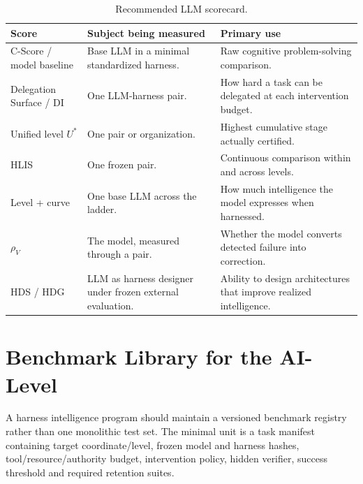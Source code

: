\documentclass[11pt]{article}
\theoremstyle{definition}
\newcommand{\rhov}{\ensuremath{\rho_V}}
\begin{document}
\begin{table}[!htbp]
\centering\small
\begin{tabularx}{\textwidth}{@{}lYY@{}}
\toprule
Score & Subject being measured & Primary use \\
\midrule
C-Score / model baseline & Base LLM in a minimal standardized harness. & Raw cognitive problem-solving comparison. \\
Delegation Surface / DI & One LLM-harness pair. & How hard a task can be delegated at each intervention budget. \\
Unified level $U^{*}$ & One pair or organization. & Highest cumulative stage actually certified. \\
HLIS & One frozen pair. & Continuous comparison within and across levels. \\
Level + curve & One base LLM across the ladder. & How much intelligence the model expresses when harnessed. \\
\rhov{} & The model, measured through a pair. & Whether the model converts detected failure into correction. \\
HDS / HDG & LLM as harness designer under frozen external evaluation. & Ability to design architectures that improve realized intelligence. \\
\bottomrule
\end{tabularx}
\caption{Recommended LLM scorecard.}
\label{tab:scorecard}
\end{table}

\section{Benchmark Library for the AI-Level}

A harness intelligence program should maintain a versioned benchmark registry rather than one monolithic test set. The minimal unit is a task manifest containing target coordinate/level, frozen model and harness hashes, tool/resource/authority budget, intervention policy, hidden verifier, success threshold and required retention suites.
\end{document}
